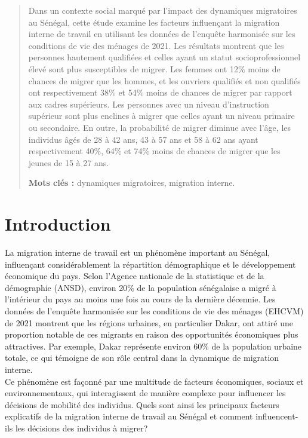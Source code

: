 \documentclass[a4paper,12pt]{article}
\begin{document}
\begin{abstract}

Dans un contexte social marqué par l'impact des dynamiques migratoires au Sénégal, cette étude examine les facteurs influençant la migration interne de travail en utilisant les données de l’enquête harmonisée sur les conditions de vie des ménages de 2021. Les résultats montrent que les personnes hautement qualifiées et celles ayant un statut socioprofessionnel élevé sont plus susceptibles de migrer. Les femmes ont 12\% moins de chances de migrer que les hommes, et les ouvriers qualifiés et non qualifiés ont respectivement 38\% et 54\% moins de chances de migrer par rapport aux cadres supérieurs. Les personnes avec un niveau d'instruction supérieur sont plus enclines à migrer que celles ayant un niveau primaire ou secondaire. En outre, la probabilité de migrer diminue avec l'âge, les individus âgés de 28 à 42 ans, 43 à 57 ans et 58 à 62 ans ayant respectivement 40\%, 64\% et 74\% moins de chances de migrer que les jeunes de 15 à 27 ans.\\

\vspace{2mm}

\textbf{Mots clés :} dynamiques migratoires, migration interne.
\end{abstract}

\newpage

\section*{Introduction}


La migration interne de travail est un phénomène important au Sénégal, influençant considérablement la répartition démographique et le développement économique du pays. Selon l'Agence nationale de la statistique et de la démographie (ANSD), environ 20\% de la population sénégalaise a migré à l'intérieur du pays au moins une fois au cours de la dernière décennie. Les données de l’enquête harmonisée sur les conditions de vie des ménages (EHCVM) de 2021 montrent que les régions urbaines, en particulier Dakar, ont attiré une proportion notable de ces migrants en raison des opportunités économiques plus attractives. Par exemple, Dakar représente environ 60\% de la population urbaine totale, ce qui témoigne de son rôle central dans la dynamique de migration interne.\\


Ce phénomène est façonné par une multitude de facteurs économiques, sociaux et environnementaux, qui interagissent de manière complexe pour influencer les décisions de mobilité des individus. Quels sont ainsi les principaux facteurs explicatifs de la migration interne de travail au Sénégal et comment influencent-ils les décisions des individus à migrer?\\
\end{document}
